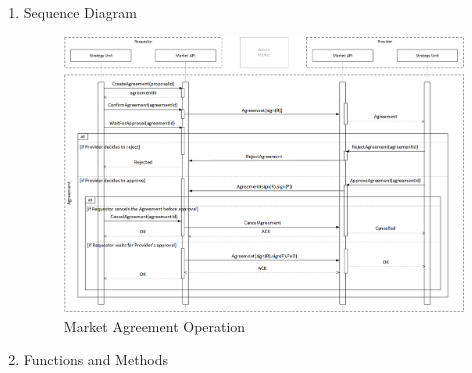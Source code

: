 \begin{enumerate}
\begin{enumerate}
The ListAgreements method is used to retrieve information about agreements. It uses optional filters:

\begin{itemize}

\item state: [Proposal, Pending, Cancelled, Rejected, Approved, Expired, Terminated ]

\item creation date and time

\item application session identifier

\end{itemize}

The GetAgreementContent() function is used to retrieve an agreement (Agreement object) based on a given identifier (agreementId).

The ValidateAgreementContent() function is used to verify an agreement (Agreement object) sent as a byte stream.

(Please see Figure ~\ref{fig:MAO} on page ~\pageref{fig:MAO}).

\item Sequence Diagram

\begin{figure}[htbp]
    \centering
    \includegraphics[width=14cm,angle=0]{./diag/Sequence/MarketAgreement-B-Sequence.png}
	\caption{Market Agreement Operation}
    \label{fig:MAO}
\end{figure}

\item Functions and Methods

\begin{table}
\footnotesize


\end{table}
\end{enumerate}
\end{enumerate}
